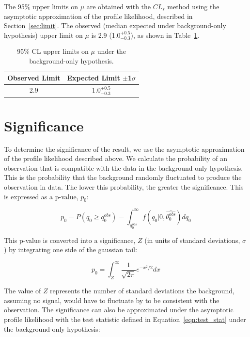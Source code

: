 The 95$\%$ upper limits on $\mu$ are obtained with the $CL_{s}$ method using the asymptotic approximation of the profile likelihood, described in Section~\ref{sec:limit}.
The observed (median expected under background-only hypothesis) upper limit on $\mu$ is 2.9 (1.0$^{+0.5}_{-0.3}$), as shown in Table~\ref{tab:limits}.

\begin{table}[htbp]
\begin{center}
  \caption[Table of Final Limits]{95$\%$ CL upper limits on $\mu$ under the background-only hypothesis.}
    \begin{tabular}{c c} \hline
      Observed Limit & Expected Limit $\pm$1$\sigma$  \\ \hline 
      2.9 & 1.0$^{+0.5}_{-0.3}$  \\
      \hline
    \end{tabular}
    \label{tab:limits}
\end{center}
\end{table}



\section{Significance}
To determine the significance of the result, we use the asymptotic approximation of the profile likelihood described above. We calculate the probability of an observation that is compatible with the
data in the background-only hypothesis. This is the probability that the background randomly fluctuated to produce the observation in data. The lower this probability, the greater the significance.
This is expressed as a p-value, $p_{0}$:

\begin{equation}
\label{eqn:signif1}
p_{0} = P(q_{0} \geq q_{0}^{obs}) = \int_{q_{0}^{obs}}^{\infty} f(q_{0}|0,\hat{\theta_{0}^{obs}}) dq_{0}
\end{equation}

\noindent This p-value is converted into a significance, $Z$ (in units of standard deviations, $\sigma$) by integrating one side of the gaussian tail:

\begin{equation}
\label{eqn:signif2}
p_{0} = \int_{Z}^{\infty} \frac{1}{\sqrt{2\pi}}e^{-x^{2}/2} dx
\end{equation}

\noindent The value of $Z$ represents the number of standard deviations the background, assuming no signal, would have to fluctuate by to be consistent with the observation. 
The significance can also be approximated under the asymptotic profile likelihood with the test statistic defined in Equation~\ref{eqn:test_stat} under the background-only hypothesis:


